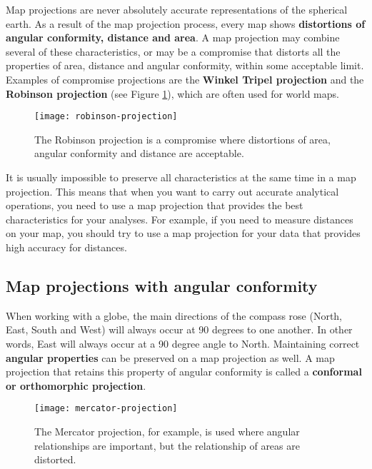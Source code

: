 Map projections are never absolutely accurate representations of the
spherical earth. As a result of the map projection process, every map shows
\textbf{distortions of angular conformity, distance and area}. A map
projection may
combine several of these characteristics, or may be a compromise that
distorts all the properties of area, distance and angular conformity, within
some acceptable limit. Examples of compromise projections are the
\textbf{Winkel Tripel projection} and the \textbf{Robinson projection} (see
Figure \ref{fig:robinson}), which are often used for world maps. 

\begin{figure}[ht]
   \begin{center}
   \caption{The Robinson projection is a compromise where distortions of
area, angular conformity and distance are acceptable.}
\label{fig:robinson}\smallskip
   \texttt{[image: robinson-projection]}
\end{center}
\end{figure}

It is usually impossible to preserve all characteristics at the same time in
a map projection. This means that when you want to carry out accurate
analytical operations, you need to use a map projection that provides the
best characteristics for your analyses. For example, if you need to measure
distances on your map, you should try to use a map projection for your data
that provides high accuracy for distances.

\subsection{Map projections with angular conformity}

When working with a globe, the main directions of the compass rose (North,
East, South and West) will always occur at 90 degrees to one another. In
other words, East will always occur at a 90 degree angle to North.
Maintaining correct \textbf{angular properties} can be preserved on a map
projection as well. A map projection that retains this property of angular
conformity is called a \textbf{conformal or orthomorphic projection}. 

\begin{figure}[ht]
   \begin{center}
   \caption{The Mercator projection, for example, is used where angular
relationships are important, but the relationship of areas are distorted.}
\label{fig:mercator}\smallskip
   \texttt{[image: mercator-projection]}
\end{center}
\end{figure}

